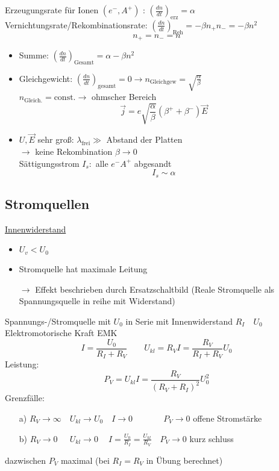\documentclass[titlepage,12pt,a4paper,ngerman]{report}
\newcommand{\tx}[1]{\textrm{#1}}
\begin{document}

\noindent
Erzeugungsrate für Ionen $ (e^-,A^+) $ : $ (\frac{dn}{dt})_{\tx{erz}} = \alpha $\\
Vernichtungsrate/Rekombinationsrate: $ (\frac{dn}{dt})_{\tx{Reh}}  = -\beta n_+ n_- = - \beta n^2$
$$ n_+ = n_- = n $$
\begin{itemize}
	\item Summe:  $ (\frac{dn}{dt}) _{\tx{Gesamt}} = \alpha - \beta n^2 $\\
	\item Gleichgewicht: $ (\frac{dn}{dt})_{\tx{gesamt}} = 0 \rightarrow n_{\tx{Gleichgew}} = \sqrt{\frac{\alpha}{\beta}} $\\
	$ n_{\tx{Gleich.}} = \tx{const.} \rightarrow $ ohmscher Bereich
	$$ \vec{j} = e \sqrt{\frac{\alpha}{\beta}} (\beta^+ + \beta^- ) \vec{E}$$
	\item $ U,\vec{E} $ sehr groß: $ \lambda_{\tx{frei}} \gg $ Abstand der Platten\\
	$ \rightarrow $ keine Rekombination $ \beta \rightarrow 0 $\\
	Sättigungsstrom $ I_s: $ alle $ e^- A^+ $ abgesandt
	$$ I_s \sim \alpha$$
\end{itemize}
\subsection{Stromquellen}
\underline{Innenwiderstand}
\begin{itemize}
	\item $ U_v < U_0 $
	\item Stromquelle hat maximale Leitung
	\item[$ \rightarrow $] Effekt beschrieben durch Ersatzschaltbild (Reale Stromquelle als Spannungsquelle in reihe mit Widerstand)
\end{itemize}
Spannungs-/Stromquelle mit $ U_0 $ in Serie mit Innenwiderstand $ R_I \quad U_0 $ Elektromotorische Kraft EMK
$$I = \frac{U_0}{R_I+R_V} \qquad U_{kl} = R_V I = \frac{R_V}{R_I+R_V}U_0$$
Leistung: $$P_V = U_{kl} I = \frac{R_V}{(R_V+R_I)^2} U_0^2$$
Grenzfälle: \begin{itemize}
	\item [a)] $ R_V \rightarrow \infty \quad U_{kl} \rightarrow U_0 \quad I \rightarrow 0 \qquad \quad \ \ \: P_V \rightarrow 0 $ offene Stromstärke
	\item [b)] $R_V \rightarrow 0 \ \ \quad U_{kl} \rightarrow 0 \ \quad I = \frac{U_0}{R_I}= \frac{U_{kl}}{R_V} \quad P_V \rightarrow0 $ kurz schluss
\end{itemize}
dazwischen $ P_V $ maximal (bei $ R_I = R_V $ in Übung berechnet)
\end{document}
